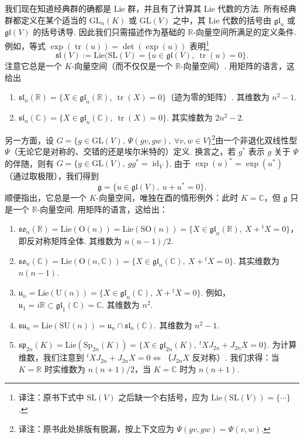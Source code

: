 \begin{numpara}[经典 Lie 代数]\label{np:lie-1-6-5}
我们现在知道经典群的确都是 Lie 群，并且有了计算其 Lie 代数的方法. 所有经典群都定义在某个适当的 $\mathrm{GL}_n(K)$ 或 $\mathrm{GL}(V)$ 之中，其 Lie 代数的括号由 $\mathfrak{gl}_n$ 或 $\mathfrak{gl}(V)$ 的括号诱导. 因此我们只需描述作为基础的 $\mathbb R$-向量空间所满足的定义条件.
例如，等式 $\exp(\operatorname{tr}(u))=\det(\exp(u))$ 表明\footnote{译注：原书下式中 $\mathrm{SL}(V)$ 之后缺一个右括号，应为 $\mathrm{Lie}(\mathrm{SL}(V))=\{\cdots\}$.}
\[
\mathfrak{sl}(V):=\mathrm{Lie}(\mathrm{SL}(V)=\{u\in\mathfrak{gl}(V),\ \operatorname{tr}(u)=0\}.
\]
注意它总是一个 $K$-向量空间（而不仅仅是一个 $\mathbb R$-向量空间）. 用矩阵的语言，这给出
\begin{enumerate}[label=\roman*)]
\item $\mathfrak{sl}_n(\mathbb R)=\{X\in\mathfrak{gl}_n(\mathbb R),\ \operatorname{tr}(X)=0\}$（迹为零的矩阵）. 其维数为 $n^2-1$.
\item $\mathfrak{sl}_n(\mathbb C)=\{X\in\mathfrak{gl}_n(\mathbb C),\ \operatorname{tr}(X)=0\}$. 其实维数为 $2n^2-2$.
\end{enumerate}
另一方面，设 $G=\{g\in\mathrm{GL}(V),\ \Psi(gv,gw),\ \forall v,w\in V\}$\footnote{译注：原书此处排版有脱漏，按上下文应为 $\Psi(gv,gw)=\Psi(v,w)$.}由一个非退化双线性型 $\Psi$（无论它是对称的、交错的还是埃尔米特的）定义. 换言之，若 $g^*$ 表示 $g$ 关于 $\Psi$ 的伴随，则有 $G=\{g\in\mathrm{GL}(V),\ gg^*=\operatorname{id}_V\}$. 由于 $\exp(u)^*=\exp(u^*)$（通过取极限），我们得到
\[
\mathfrak g=\{u\in\mathfrak{gl}(V),\ u+u^*=0\}.
\]
顺便指出，它总是一个 $K$-向量空间，唯独在酉的情形例外：此时 $K=\mathbb C$，但 $\mathfrak g$ 只是一个 $\mathbb R$-向量空间. 用矩阵的语言，这给出：
\begin{enumerate}[label=\roman*),start=3]
\item $\mathfrak{so}_n(\mathbb R)=\mathrm{Lie}(\mathrm{O}(n))=\mathrm{Lie}(\mathrm{SO}(n))=\{X\in\mathfrak{gl}_n(\mathbb R),\ X+{}^tX=0\}$，即反对称矩阵全体. 其维数为 $n(n-1)/2$.
\item $\mathfrak{so}_n(\mathbb C)=\mathrm{Lie}(\mathrm{O}(n,\mathbb C))=\{X\in\mathfrak{gl}_n(\mathbb C),\ X+{}^tX=0\}$. 其实维数为 $n(n-1)$.
\item $\mathfrak u_n=\mathrm{Lie}(\mathrm{U}(n))=\{X\in\mathfrak{gl}_n(\mathbb C),\ X+{}^t\overline{X}=0\}$. 例如，$\mathfrak u_1=i\mathbb R\subset\mathfrak{gl}_1(\mathbb C)=\mathbb C$. 其维数为 $n^2$.
\item $\mathfrak{su}_n=\mathrm{Lie}(\mathrm{SU}(n))=\mathfrak u_n\cap\mathfrak{sl}_n(\mathbb C)$. 其维数为 $n^2-1$.
\item $\mathfrak{sp}_{2n}(K)=\mathrm{Lie}(\mathrm{Sp}_{2n}(K))=\{X\in\mathfrak{gl}_{2n}(K),\ {}^tXJ_{2n}+J_{2n}X=0\}$. 为计算维数，我们注意到 ${}^tXJ_{2n}+J_{2n}X=0\Leftrightarrow$（$J_{2n}X$ 反对称）. 我们求得：当 $K=\mathbb R$ 时实维数为 $n(n+1)/2$，当 $K=\mathbb C$ 时为 $n(n+1)$.
\end{enumerate}
\end{numpara}
